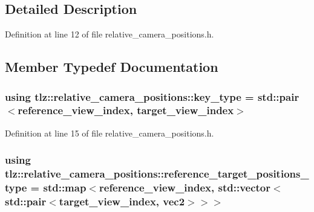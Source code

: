 \subsection{Detailed Description}


Definition at line 12 of file relative\+\_\+camera\+\_\+positions.\+h.



\subsection{Member Typedef Documentation}
\subsubsection[{\texorpdfstring{key\+\_\+type}{key_type}}]{\setlength{\rightskip}{0pt plus 5cm}using {\bf tlz\+::relative\+\_\+camera\+\_\+positions\+::key\+\_\+type} =  std\+::pair$<${\bf reference\+\_\+view\+\_\+index}, {\bf target\+\_\+view\+\_\+index}$>$}\hypertarget{structtlz_1_1relative__camera__positions_a131cad34840b596589a44dfdc079ff6c}{}\label{structtlz_1_1relative__camera__positions_a131cad34840b596589a44dfdc079ff6c}


Definition at line 15 of file relative\+\_\+camera\+\_\+positions.\+h.

\subsubsection[{\texorpdfstring{reference\+\_\+target\+\_\+positions\+\_\+type}{reference_target_positions_type}}]{\setlength{\rightskip}{0pt plus 5cm}using {\bf tlz\+::relative\+\_\+camera\+\_\+positions\+::reference\+\_\+target\+\_\+positions\+\_\+type} =  std\+::map$<${\bf reference\+\_\+view\+\_\+index}, std\+::vector$<$std\+::pair$<${\bf target\+\_\+view\+\_\+index}, {\bf vec2}$>$$>$$>$}\hypertarget{structtlz_1_1relative__camera__positions_add616a43c418d61c9945d71ac7d403de}{}\label{structtlz_1_1relative__camera__positions_add616a43c418d61c9945d71ac7d403de}


